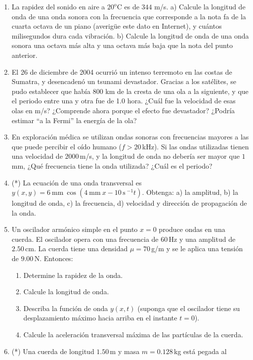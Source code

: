 \documentclass[a4paper,12pt]{article}
\begin{document}
\begin{enumerate}
	\item La rapidez del sonido en aire a $20^{\mathrm{o}}$C es de $344$ m/s.
		a) Calcule la longitud de onda de una onda sonora con la frecuencia que
		corresponde a la nota fa de la cuarta octava de un piano (averigüe este
		dato en Internet), y cuántos milisegundos dura cada vibración. b)
		Calcule la longitud de onda de una onda sonora una octava más alta y
		una octava más baja que la nota del punto anterior.
	\item El 26 de diciembre de 2004 ocurrió un intenso terremoto en las costas
		de Sumatra, y desencadenó un tsunami devastador. Gracias a los
		satélites, se pudo establecer que había 800 km de la cresta de una ola
		a la siguiente, y que el periodo entre una y otra fue de 1.0 hora.
		¿Cuál fue la velocidad de esas olas en m/s? ¿Comprende ahora porque el
		efecto fue devastador? ¿Podría estimar ``a la Fermi'' la energía de la
		ola?
	\item En exploración médica se utilizan ondas sonoras con frecuencias
		mayores a las que puede percibir el oído humano ($f>20$\,kHz). Si las
		ondas utilizadas tienen una velocidad de $2000$\,m/s, y la longitud de
		onda no debería ser mayor que $1$\,mm, ¿Qué frecuencia tiene la onda
		utilizada? ¿Cuál es el periodo?
	\item (*) La ecuación de una onda transversal es $y(x,y)=6\mathrm{\ mm\ } \cos
		\left ( 4\mathrm{\ mm\ } x - 10\mathrm{\,s\ }^{-1} t \right )$.
		Obtenga: a) la amplitud, b) la longitud de onda, c) la frecuencia, d)
		velocidad y dirección de propagación de la onda.
	\item Un oscilador armónico simple en el punto $x=0$ produce ondas en una
		cuerda. El oscilador opera con una frecuencia de $60$\,Hz y una
		amplitud de $2.50$\,cm. La cuerda tiene una densidad $\mu=70$\,g/m y se
		le aplica una tensión de $9.00$\,N. Entonces:
		\begin{enumerate}
			\item Determine la rapidez de la onda. 
			\item Calcule la longitud de onda.
			\item Describa la función de onda $y(x, t)$ (suponga que el
				oscilador tiene su desplazamiento máximo hacia arriba en el
				instante $t=0$).
			\item Calcule la aceleración transversal máxima de las partículas
				de la cuerda.
		\end{enumerate}
	\item (*) Una cuerda de longitud $1.50$\,m y masa $m=0.128$\,kg está pegada al

\end{enumerate}
\end{document}

